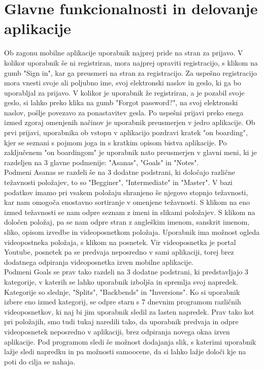 \documentclass[a4paper, 12pt]{book}
\begin{document}
\section{Glavne funkcionalnosti in delovanje aplikacije}
Ob zagonu mobilne aplikacije uporabnik najprej pride na stran za prijavo. V kolikor uporabnik še ni registriran, mora najprej opraviti registracijo, s klikom na gumb "Sign in", kar ga preusmeri na stran za registracijo. Za uspešno registracijo mora vnesti svoje ali poljubno ime, svoj elektronski naslov in geslo, ki ga bo uporabljal za prijavo. V kolikor je uporabnik že registriran, a je pozabil svoje geslo, si lahko preko klika na gumb "Forgot password?", na svoj elektronski naslov, pošlje povezavo za ponastavitev gesla. Po uspešni prijavi preko enega izmed zgoraj omenjenih načinov je uporabnik preusmerjen v jedro aplikacije. Ob prvi prijavi, uporabnika ob vstopu v aplikacijo pozdravi kratek "on boarding", kjer se seznani s pojmom joga in s kratkim opisom bistva aplikacije. Po zaključenem "on boardingom" je uporabnik nato preusmerjen v glavni meni, ki je razdeljen na 3 glavne podmenije: "Asanas", "Goals" in "Notes".\\

Podmeni Asanas se razdeli še na 3 dodatne podstrani, ki določajo različne težavnosti položajev, to so "Begginer", "Intermediate" in "Master". V bazi podatkov imamo pri vsakem položaju shranjeno še njegovo stopnjo težavnosti, kar nam omogoča enostavno sortiranje v omenjene težavnosti. S klikom na eno izmed težavnosti se nam odpre seznam z imeni in slikami položajev. S klikom na določen položaj, pa se nam odpre stran z angleškim imenom, sanskrit imenom, sliko, opisom izvedbe in videoposnetkom položaja. Uporabnik ima možnost ogleda videopostneka položaja, s klikom na posnetek. Vir videoposnetka je portal Youtube, posnetek pa se predvaja neposredno v sami aplikaciji, torej brez dodatnega odpiranja videoposnetka izven mobilne aplikacije. \\

Podmeni Goals se prav tako razdeli na 3 dodatne podstrani, ki predstavljajo 3 kategorije, v katerih se lahko uporabnik izboljša in spremlja svoj napredek. Kategorije so slednje, "Splits", "Backbends" in "Inversions". Ko si uporabnik izbere eno izmed kategorij, se odpre starn s 7 dnevnim programom različnih videoposnetkov, ki naj bi jim uporabnik sledil za lasten napredek. Prav tako kot pri položajih, smo tudi tukaj naredili tako, da uporabnik predvaja in odpre videoposnetek neposredno v aplikaciji, brez odpiranja novega okna izven aplikacije. 
Pod programom sledi še možnost dodajanja slik, s katerimi uporabnik lažje sledi napredku in pa možnosti samoocene, da si lahko lažje določi kje na poti do cilja se nahaja.\\
\end{document}
